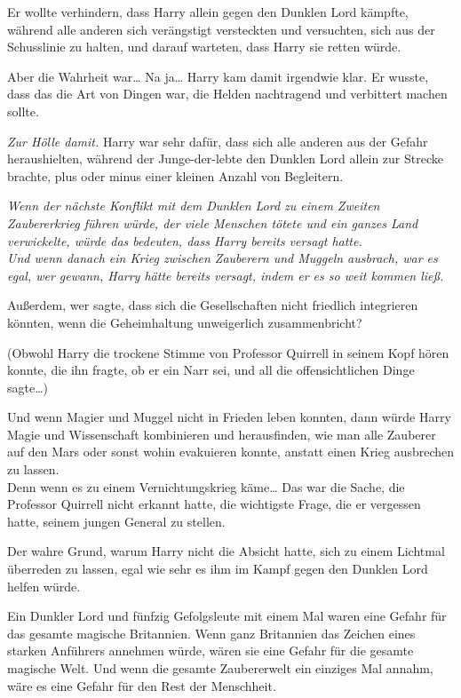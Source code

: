 {Er wollte verhindern, dass Harry allein gegen den Dunklen Lord kämpfte, während alle anderen sich verängstigt versteckten und versuchten, sich aus der Schusslinie zu halten, und darauf warteten, dass Harry sie retten würde.

Aber die Wahrheit war… Na ja… Harry kam damit irgendwie klar. Er wusste, dass das die Art von Dingen war, die Helden nachtragend und verbittert machen sollte.

\emph{Zur Hölle damit.} Harry war sehr dafür, dass sich alle anderen aus der Gefahr heraushielten, während der Junge-der-lebte den Dunklen Lord allein zur Strecke brachte, plus oder minus einer kleinen Anzahl von Begleitern.

\emph{Wenn der nächste Konflikt mit dem Dunklen Lord zu einem Zweiten Zaubererkrieg führen würde, der viele Menschen tötete und ein ganzes Land verwickelte, würde das bedeuten, dass Harry bereits versagt hatte.}\\ \emph{\hfill\break Und wenn danach ein Krieg zwischen Zauberern und Muggeln ausbrach, war es egal, wer gewann, Harry hätte bereits versagt, indem er es so weit kommen ließ.}

Außerdem, wer sagte, dass sich die Gesellschaften nicht friedlich integrieren könnten, wenn die Geheimhaltung unweigerlich zusammenbricht?

(Obwohl Harry die trockene Stimme von Professor Quirrell in seinem Kopf hören konnte, die ihn fragte, ob er ein Narr sei, und all die offensichtlichen Dinge sagte…)

Und wenn Magier und Muggel nicht in Frieden leben konnten, dann würde Harry Magie und Wissenschaft kombinieren und herausfinden, wie man alle Zauberer auf den Mars oder sonst wohin evakuieren konnte, anstatt einen Krieg ausbrechen zu lassen.\\ Denn wenn es zu einem Vernichtungskrieg käme… Das war die Sache, die Professor Quirrell nicht erkannt hatte, die wichtigste Frage, die er vergessen hatte, seinem jungen General zu stellen.

Der wahre Grund, warum Harry nicht die Absicht hatte, sich zu einem Lichtmal überreden zu lassen, egal wie sehr es ihm im Kampf gegen den Dunklen Lord helfen würde.

Ein Dunkler Lord und fünfzig Gefolgsleute mit einem Mal waren eine Gefahr für das gesamte magische Britannien. Wenn ganz Britannien das Zeichen eines starken Anführers annehmen würde, wären sie eine Gefahr für die gesamte magische Welt. Und wenn die gesamte Zaubererwelt ein einziges Mal annahm, wäre es eine Gefahr für den Rest der Menschheit.

}
